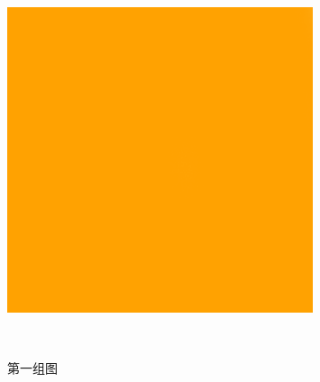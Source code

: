 \begin{figure}[h]
\begin{minipage}[t]{0.5\textwidth}
{    \includegraphics[width=0.8\textwidth]
        {pic/example.png}
  }
  \caption{第一组图}
\end{minipage}
\begin{minipage}[t]{0.5\textwidth}
    \centering
  \\
  \subfloat[图形b]{
    \label{fig:PicB}
}
\end{minipage}
\end{figure}
